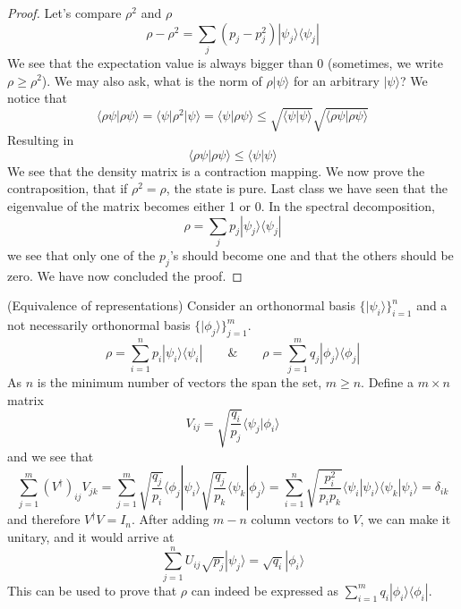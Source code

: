 \begin{proof}
Let's compare $\rho ^2$ and $\rho $
	\[{\rho }-{\rho }^2=\sum _{j}(p_{j}-p_{j}^2)|\psi _{j}\rangle \langle \psi _{j}|\]
We see that the expectation value is always bigger than 0 (sometimes, we write ${\rho }\geq {\rho }^2$). We may also ask, what is the norm of $\rho |\psi \rangle $ for an arbitrary $|\psi \rangle $? We notice that
\[\langle{\rho }\psi |{\rho }\psi \rangle =\langle \psi |{\rho }^2|\psi \rangle =\langle \psi|\rho \psi \rangle \leq  \sqrt{\langle \psi |\psi \rangle }\sqrt{\langle {\rho } \psi |{\rho } \psi\rangle } \]
Resulting in
\[\langle {\rho }\psi |{\rho }\psi \rangle\leq \langle \psi |\psi \rangle  \]
We see that the density matrix is a contraction mapping. We now prove the contraposition, that if ${\rho }^2={\rho }$, the state is pure. Last class we have seen that the eigenvalue of the matrix becomes either 1 or 0. In the spectral decomposition,
\[{\rho }=\sum _{j}p_{j}|\psi _{j}\rangle \langle \psi _{j}|\]
we see that only one of the $p_{j}$'s should become one and that the others should be zero. We have now concluded the proof. 
\end{proof}
\vspace{2ex}
\begin{thm}
(Equivalence of representations) Consider an orthonormal basis $\{|\psi _{i}\rangle \}_{i=1}^{n}$ and a not necessarily orthonormal basis $\{|\phi _{j}\rangle \}_{j=1}^{m}$. 
\[{\rho }=\sum ^{n}_{i=1}p_{i}|\psi _{i}\rangle \langle \psi _{i}|\qquad \& \qquad {\rho }=\sum ^{m}_{j=1}q_{j}|\phi   _{j}\rangle \langle \phi   _{j}|\]
As $n$ is the minimum number of vectors the span the set, $m\geq n$. Define a $m\times n$ matrix
\[V_{ij}=\sqrt{\dfrac{q_{i}}{p_{j}}}\langle \psi _{j}|\phi _{i}\rangle \]
and we see that
\[\sum ^{m}_{j=1}(V^{\dagger })_{ij}V_{jk}=\sum ^{m}_{j=1}\sqrt{\dfrac{q_{j}}{p_{i}}}\langle \phi _{j}|\psi _{i}\rangle \sqrt{\dfrac{q_{j}}{p_{k}}}\langle \psi _{k}|\phi  _{j}\rangle =\sum _{i=1}^{n}\sqrt{\dfrac{p_{i}^2}{p_{i}p_{k}}}\langle \psi _{i}|\psi _{i}\rangle \langle \psi _{k}|\psi _{i}\rangle=\delta _{ik} \]
and therefore $V^{\dagger }V=I_{n}$. After adding $m-n$ column vectors to $V$, we can make it unitary, and it would arrive at
\[\sum ^{n}_{j=1}U_{ij}\sqrt{p_{j}}|\psi _{j}\rangle =\sqrt{q_{i}}|\phi _{i}\rangle \]
This can be used to prove that $\rho $ can indeed be expressed as $\sum ^{m}_{i=1}q_{i}|\phi _{i}\rangle \langle \phi _{i}|$.
\end{thm}
\vspace{2ex}

